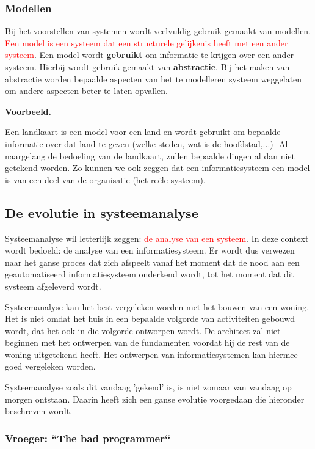 \subsubsection{Modellen}

Bij het voorstellen van systemen wordt veelvuldig gebruik gemaakt van modellen. \textcolor{red}{Een model is een systeem dat een structurele gelijkenis heeft met een ander systeem}. Een model wordt \textbf{gebruikt} om informatie te krijgen over een ander systeem. Hierbij wordt gebruik gemaakt van \textbf{abstractie}. Bij het maken van abstractie worden bepaalde aspecten van het te modelleren systeem weggelaten om andere aspecten beter te laten opvallen.

\textbf{Voorbeeld.}

Een landkaart is een model voor een land en wordt gebruikt om bepaalde informatie over dat land te geven (welke steden, wat is de hoofdstad,...)- Al naargelang de bedoeling van de landkaart, zullen bepaalde dingen al dan niet getekend worden.
Zo kunnen we ook zeggen dat een informatiesysteem een model is van een deel van de organisatie (het reële systeem).

\subsection{De evolutie in systeemanalyse}

Systeemanalyse wil letterlijk zeggen: \textcolor{red}{de analyse van een systeem}. In deze context wordt bedoeld: de analyse van een informatiesysteem. Er wordt dus verwezen naar het ganse proces dat zich afspeelt vanaf het moment dat de nood aan een geautomatiseerd informatiesysteem onderkend wordt, tot het moment dat dit systeem afgeleverd wordt.

Systeemanalyse kan het best vergeleken worden met het bouwen van een woning. Het is niet omdat het huis in een bepaalde volgorde van activiteiten gebouwd wordt, dat het ook in die volgorde ontworpen wordt. De architect zal niet beginnen met het ontwerpen van de fundamenten voordat hij de rest van de woning uitgetekend heeft. Het ontwerpen van informatiesystemen kan hiermee goed vergeleken worden.

Systeemanalyse zoals dit vandaag 'gekend' is, is niet zomaar van vandaag op morgen ontstaan. Daarin heeft zich een ganse evolutie voorgedaan die hieronder beschreven wordt.

\subsubsection{Vroeger: \textquotedblleft The bad programmer\textquotedblleft }

